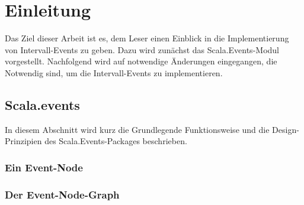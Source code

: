\section{Einleitung}
Das Ziel dieser Arbeit ist es, dem Leser einen Einblick in die Implementierung
von Intervall-Events zu geben. Dazu wird zunächst das Scala.Events-Modul
vorgestellt. Nachfolgend wird auf notwendige Änderungen eingegangen, die
Notwendig sind, um die Intervall-Events zu implementieren.

\subsection{Scala.events}

In diesem Abschnitt wird kurz die Grundlegende Funktionsweise und die
Design-Prinzipien des Scala.Events-Packages beschrieben.

\subsubsection{Ein Event-Node}



\subsubsection{Der Event-Node-Graph}


